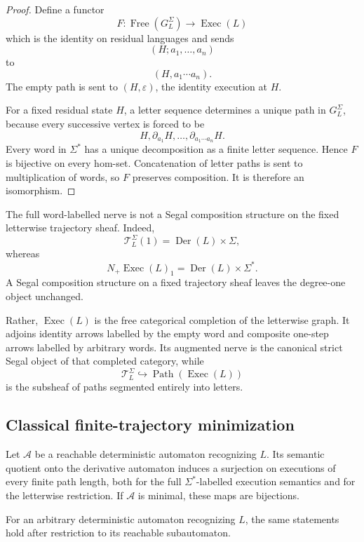 \begin{proof}
Define a functor
\[
    F:
    \operatorname{Free}(G_L^\Sigma)
    \to
    \operatorname{Exec}(L)
\]
which is the identity on residual languages and sends
\[
    (H;a_1,\ldots,a_n)
\]
to
\[
    (H,a_1\cdots a_n).
\]
The empty path is sent to \((H,\varepsilon)\), the identity execution at
\(H\).

For a fixed residual state \(H\), a letter sequence determines a unique path
in \(G_L^\Sigma\), because every successive vertex is forced to be
\[
    H,
    \partial_{a_1}H,
    \ldots,
    \partial_{a_1\cdots a_n}H.
\]
Every word in \(\Sigma^\ast\) has a unique decomposition as a finite letter
sequence. Hence \(F\) is bijective on every hom-set. Concatenation of letter
paths is sent to multiplication of words, so \(F\) preserves composition.
It is therefore an isomorphism.
\end{proof}

\begin{remark}
\label{rem:letterwise-contraction}
The full word-labelled nerve is not a Segal composition structure on the fixed
letterwise trajectory sheaf. Indeed,
\[
    \mathscr T_L^\Sigma(1)
    =
    \operatorname{Der}(L)\times\Sigma,
\]
whereas
\[
    N_+\operatorname{Exec}(L)_1
    =
    \operatorname{Der}(L)\times\Sigma^\ast.
\]
A Segal composition structure on a fixed trajectory sheaf leaves the degree-one
object unchanged.

Rather, \(\operatorname{Exec}(L)\) is the free categorical completion of the
letterwise graph. It adjoins identity arrows labelled by the empty word and
composite one-step arrows labelled by arbitrary words. Its augmented nerve is
the canonical strict Segal object of that completed category, while
\[
    \mathscr T_L^\Sigma
    \hookrightarrow
    \operatorname{Path}(\operatorname{Exec}(L))
\]
is the subsheaf of paths segmented entirely into letters.
\end{remark}

\subsection{Classical finite-trajectory minimization}
\label{subsec:classical-temporal-minimization}

\begin{corollary}
\label{cor:classical-temporal-minimization}
Let \(\mathcal A\) be a reachable deterministic automaton recognizing \(L\).
Its semantic quotient onto the derivative automaton induces a surjection on
executions of every finite path length, both for the full
\(\Sigma^\ast\)-labelled execution semantics and for the letterwise
restriction. If \(\mathcal A\) is minimal, these maps are bijections.

For an arbitrary deterministic automaton recognizing \(L\), the same
statements hold after restriction to its reachable subautomaton.
\end{corollary}

